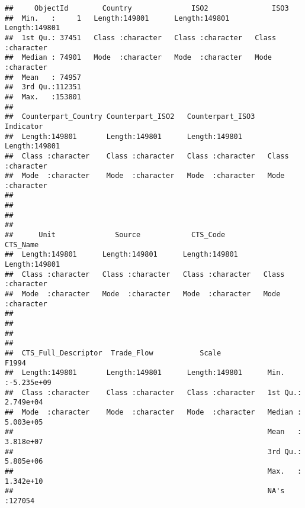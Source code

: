 \documentclass[
]{article}
\begin{document}
\begin{verbatim}
##     ObjectId        Country              ISO2               ISO3          
##  Min.   :     1   Length:149801      Length:149801      Length:149801     
##  1st Qu.: 37451   Class :character   Class :character   Class :character  
##  Median : 74901   Mode  :character   Mode  :character   Mode  :character  
##  Mean   : 74957                                                           
##  3rd Qu.:112351                                                           
##  Max.   :153801                                                           
##                                                                           
##  Counterpart_Country Counterpart_ISO2   Counterpart_ISO3    Indicator        
##  Length:149801       Length:149801      Length:149801      Length:149801     
##  Class :character    Class :character   Class :character   Class :character  
##  Mode  :character    Mode  :character   Mode  :character   Mode  :character  
##                                                                              
##                                                                              
##                                                                              
##                                                                              
##      Unit              Source            CTS_Code           CTS_Name        
##  Length:149801      Length:149801      Length:149801      Length:149801     
##  Class :character   Class :character   Class :character   Class :character  
##  Mode  :character   Mode  :character   Mode  :character   Mode  :character  
##                                                                             
##                                                                             
##                                                                             
##                                                                             
##  CTS_Full_Descriptor  Trade_Flow           Scale               F1994           
##  Length:149801       Length:149801      Length:149801      Min.   :-5.235e+09  
##  Class :character    Class :character   Class :character   1st Qu.: 2.749e+04  
##  Mode  :character    Mode  :character   Mode  :character   Median : 5.003e+05  
##                                                            Mean   : 3.818e+07  
##                                                            3rd Qu.: 5.805e+06  
##                                                            Max.   : 1.342e+10  
##                                                            NA's   :127054      

\end{verbatim}
\end{document}
